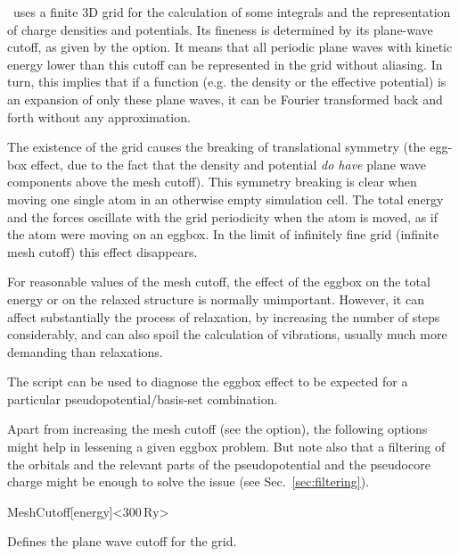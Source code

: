 \siesta\ uses a finite 3D grid for the calculation of some
integrals and the representation of charge densities and potentials.
Its fineness is determined by its plane-wave cutoff, as
given by the  option. It means that all periodic
plane waves with kinetic energy lower than this cutoff 
can be represented in the grid without aliasing. In turn,
this implies that if a function (e.g. the density or the 
effective potential) is an expansion of
only these plane waves, it can be Fourier transformed
back and forth without any approximation.

The existence of the grid causes the breaking of translational
symmetry (the egg-box effect, due to the fact that the density
and potential \emph{do have} plane wave components above
the mesh cutoff).  This symmetry breaking is clear when
moving one single atom in an otherwise empty simulation cell. The
total energy and the forces oscillate with the grid periodicity when
the atom is moved, as if the atom were moving on an eggbox. In the
limit of infinitely fine grid (infinite mesh cutoff) this effect
disappears.

For reasonable values of the mesh cutoff, the effect of the eggbox
on the total energy or on the relaxed structure is normally unimportant.
However, it can affect substantially the process of relaxation, by
increasing the number of steps considerably, and can also spoil the
calculation of vibrations, usually much more demanding than relaxations.

The  script can be used to
diagnose the eggbox effect to be expected for a particular
pseudopotential/basis-set combination.

Apart from increasing the mesh cutoff (see the  option),
the following options might help in lessening a given eggbox problem. But
note also that a filtering of the orbitals and the relevant parts of
the pseudopotential and the pseudocore charge might be enough to solve
the issue (see Sec.~\ref{sec:filtering}).

\begin{fdfentry}{MeshCutoff}[energy]<$300\,\mathrm{Ry}$>

  Defines the plane wave cutoff for the grid.
  
 
\end{fdfentry}

